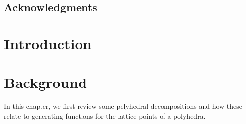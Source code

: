 % 
% 
% 
% 
%






   \frontmatter

   \pagestyle{prelim}
   
   
   \newpage
   
   \doublespacing
   
   \tableofcontents
   \newpage
   
   
   \newpage
   
   \section*{Acknowledgments}
   
   
   \mainmatter
   
   \pagestyle{maintext}
   
   
   \chapter{Introduction}
   \label{ch:IntroductionLabel}
   
   
   \chapter{Background}
   \label{ch:background}
   
   In this chapter, we first review some polyhedral decompositions and how these relate to generating functions for the lattice points of a polyhedra. 
   
